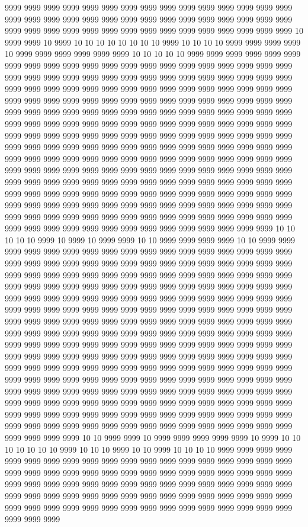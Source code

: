 9999 9999 9999 9999 9999 9999 9999 9999 9999 9999 9999 9999 9999 9999 9999 9999 9999 9999 9999 9999 9999 9999 9999 9999 9999 9999 9999 9999 9999 9999 9999 9999 9999 9999 9999 9999 9999 9999 9999 9999 9999 9999 9999 9999 9999 10 9999 9999 10 9999 10 10 10 10 10 10 10 10 9999 10 10 10 10 9999 9999 9999 9999 10 9999 9999 9999 9999 9999 9999 10 10 10 10 10 9999 9999 9999 9999 9999 9999 9999 9999 9999 9999 9999 9999 9999 9999 9999 9999 9999 9999 9999 9999 9999 9999 9999 9999 9999 9999 9999 9999 9999 9999 9999 9999 9999 9999 9999 9999 9999 9999 9999 9999 9999 9999 9999 9999 9999 9999 9999 9999 9999 9999 9999 9999 9999 9999 9999 9999 9999 9999 9999 9999 9999 9999 9999 9999 9999 9999 9999 9999 9999 9999 9999 9999 9999 9999 9999 9999 9999 9999 9999 9999 9999 9999 9999 9999 9999 9999 9999 9999 9999 9999 9999 9999 9999 9999 9999 9999 9999 9999 9999 9999 9999 9999 9999 9999 9999 9999 9999 9999 9999 9999 9999 9999 9999 9999 9999 9999 9999 9999 9999 9999 9999 9999 9999 9999 9999 9999 9999 9999 9999 9999 9999 9999 9999 9999 9999 9999 9999 9999 9999 9999 9999 9999 9999 9999 9999 9999 9999 9999 9999 9999 9999 9999 9999 9999 9999 9999 9999 9999 9999 9999 9999 9999 9999 9999 9999 9999 9999 9999 9999 9999 9999 9999 9999 9999 9999 9999 9999 9999 9999 9999 9999 9999 9999 9999 9999 9999 9999 9999 9999 9999 9999 9999 9999 9999 9999 9999 9999 9999 9999 9999 9999 9999 9999 9999 9999 9999 9999 9999 9999 9999 9999 9999 9999 9999 9999 9999 9999 9999 9999 9999 9999 9999 9999 9999 9999 9999 9999 9999 9999 9999 10 10 10 10 10 9999 10 9999 10 9999 9999 10 10 9999 9999 9999 9999 10 10 9999 9999 9999 9999 9999 9999 9999 9999 9999 9999 9999 9999 9999 9999 9999 9999 9999 9999 9999 9999 9999 9999 9999 9999 9999 9999 9999 9999 9999 9999 9999 9999 9999 9999 9999 9999 9999 9999 9999 9999 9999 9999 9999 9999 9999 9999 9999 9999 9999 9999 9999 9999 9999 9999 9999 9999 9999 9999 9999 9999 9999 9999 9999 9999 9999 9999 9999 9999 9999 9999 9999 9999 9999 9999 9999 9999 9999 9999 9999 9999 9999 9999 9999 9999 9999 9999 9999 9999 9999 9999 9999 9999 9999 9999 9999 9999 9999 9999 9999 9999 9999 9999 9999 9999 9999 9999 9999 9999 9999 9999 9999 9999 9999 9999 9999 9999 9999 9999 9999 9999 9999 9999 9999 9999 9999 9999 9999 9999 9999 9999 9999 9999 9999 9999 9999 9999 9999 9999 9999 9999 9999 9999 9999 9999 9999 9999 9999 9999 9999 9999 9999 9999 9999 9999 9999 9999 9999 9999 9999 9999 9999 9999 9999 9999 9999 9999 9999 9999 9999 9999 9999 9999 9999 9999 9999 9999 9999 9999 9999 9999 9999 9999 9999 9999 9999 9999 9999 9999 9999 9999 9999 9999 9999 9999 9999 9999 9999 9999 9999 9999 9999 9999 9999 9999 9999 9999 9999 9999 9999 9999 9999 9999 9999 9999 9999 9999 9999 9999 9999 9999 9999 9999 9999 9999 9999 9999 9999 9999 9999 9999 9999 9999 9999 9999 9999 9999 9999 9999 9999 9999 9999 9999 9999 9999 9999 9999 10 10 9999 9999 10 9999 9999 9999 9999 9999 10 9999 10 10 10 10 10 10 10 9999 10 10 10 9999 10 10 9999 10 10 10 10 9999 9999 9999 9999 9999 9999 9999 9999 9999 9999 9999 9999 9999 9999 9999 9999 9999 9999 9999 9999 9999 9999 9999 9999 9999 9999 9999 9999 9999 9999 9999 9999 9999 9999 9999 9999 9999 9999 9999 9999 9999 9999 9999 9999 9999 9999 9999 9999 9999 9999 9999 9999 9999 9999 9999 9999 9999 9999 9999 9999 9999 9999 9999 9999 9999 9999 9999 9999 9999 9999 9999 9999 9999 9999 9999 9999 9999 9999 9999 9999 9999 9999 